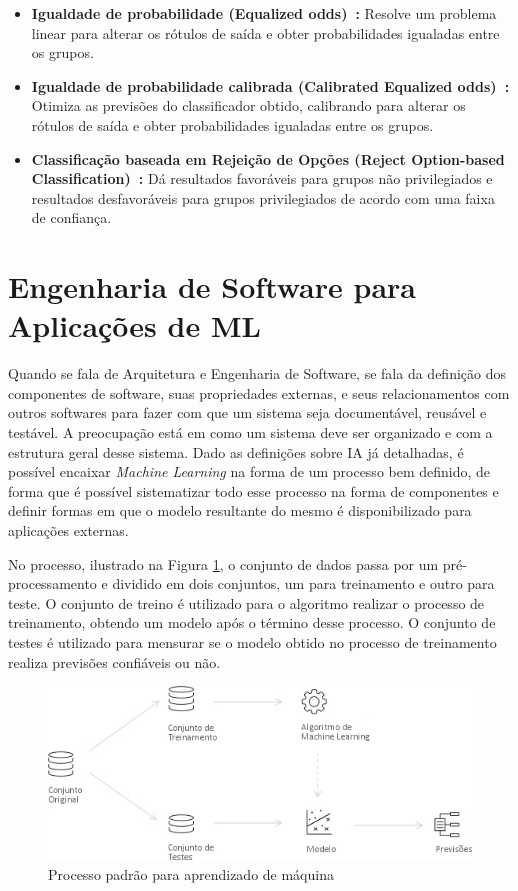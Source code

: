 \documentclass[portugues]{ic-tese}
\begin{document}
\begin{itemize}
\item \textbf{Igualdade de probabilidade (Equalized odds)~\citep{Hardt_2016}:} Resolve um problema linear para alterar os rótulos de saída e obter probabilidades igualadas entre os grupos.

\item \textbf{Igualdade de probabilidade calibrada (Calibrated Equalized odds)~\citep{Pleiss_2017}:} Otimiza as previsões do classificador obtido, calibrando para alterar os rótulos de saída e obter probabilidades igualadas entre os grupos.

\item \textbf{Classificação baseada em Rejeição de Opções (Reject Option-based Classification)~\citep{Kamiran_2012}:} Dá resultados favoráveis para grupos não privilegiados e resultados desfavoráveis para grupos privilegiados de acordo com uma faixa de confiança.

\end{itemize}

\section{Engenharia de Software para Aplicações de ML}
\label{sec:EngSoftware}

Quando se fala de Arquitetura e Engenharia de Software, se fala da definição dos componentes de software, suas propriedades externas, e seus relacionamentos com outros softwares para fazer com que um sistema seja documentável, reusável e testável. A preocupação está em como um sistema deve ser organizado e com a estrutura geral desse sistema. Dado as definições sobre IA já detalhadas, é possível encaixar \textit{Machine Learning} na forma de um processo bem definido, de forma que é possível sistematizar todo esse processo na forma de componentes e definir formas em que o modelo resultante do mesmo é disponibilizado para aplicações externas.

No processo, ilustrado na Figura \ref{fig:MLProcess}, o conjunto de dados passa por um pré-processamento e dividido em dois conjuntos, um para treinamento e outro para teste. O conjunto de treino é utilizado para o algoritmo realizar o processo de treinamento, obtendo um modelo após o término desse processo. O conjunto de testes é utilizado para mensurar se o modelo obtido no processo de treinamento realiza previsões confiáveis ou não.

\begin{figure}[h]
\centering
\includegraphics[scale=0.6]{images/ML_Process.jpg}
\caption {Processo padrão para aprendizado de máquina}
\label{fig:MLProcess}
\end{figure}
\end{document}
